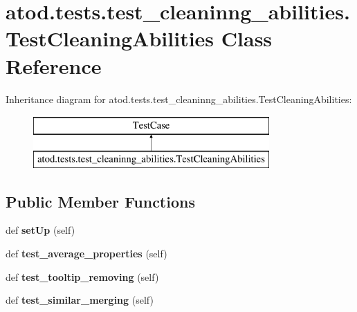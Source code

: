 \hypertarget{classatod_1_1tests_1_1test__cleaninng__abilities_1_1_test_cleaning_abilities}{}\section{atod.\+tests.\+test\+\_\+cleaninng\+\_\+abilities.\+Test\+Cleaning\+Abilities Class Reference}
\label{classatod_1_1tests_1_1test__cleaninng__abilities_1_1_test_cleaning_abilities}
Inheritance diagram for atod.\+tests.\+test\+\_\+cleaninng\+\_\+abilities.\+Test\+Cleaning\+Abilities\+:\begin{figure}[H]
\begin{center}
\leavevmode
\includegraphics[height=2.000000cm]{classatod_1_1tests_1_1test__cleaninng__abilities_1_1_test_cleaning_abilities}
\end{center}
\end{figure}
\subsection*{Public Member Functions}
\begin{DoxyCompactItemize}
\item 
def {\bfseries set\+Up} (self)\hypertarget{classatod_1_1tests_1_1test__cleaninng__abilities_1_1_test_cleaning_abilities_aecfd3bb389a487384661abb9b0f5ef78}{}\label{classatod_1_1tests_1_1test__cleaninng__abilities_1_1_test_cleaning_abilities_aecfd3bb389a487384661abb9b0f5ef78}

\item 
def {\bfseries test\+\_\+average\+\_\+properties} (self)\hypertarget{classatod_1_1tests_1_1test__cleaninng__abilities_1_1_test_cleaning_abilities_a93403e9282cdc7dced771bf371d54341}{}\label{classatod_1_1tests_1_1test__cleaninng__abilities_1_1_test_cleaning_abilities_a93403e9282cdc7dced771bf371d54341}

\item 
def {\bfseries test\+\_\+tooltip\+\_\+removing} (self)\hypertarget{classatod_1_1tests_1_1test__cleaninng__abilities_1_1_test_cleaning_abilities_a3f6d4e79294b75ab48e48ef985c769b7}{}\label{classatod_1_1tests_1_1test__cleaninng__abilities_1_1_test_cleaning_abilities_a3f6d4e79294b75ab48e48ef985c769b7}

\item 
def {\bfseries test\+\_\+similar\+\_\+merging} (self)\hypertarget{classatod_1_1tests_1_1test__cleaninng__abilities_1_1_test_cleaning_abilities_a90f5f3e239870b89b43254d017b24cf6}{}\label{classatod_1_1tests_1_1test__cleaninng__abilities_1_1_test_cleaning_abilities_a90f5f3e239870b89b43254d017b24cf6}

\end{DoxyCompactItemize}
